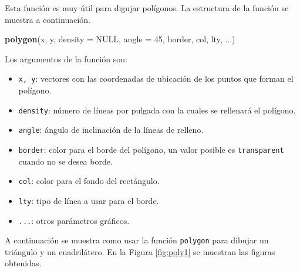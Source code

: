 \documentclass[10pt,]{krantz}
\makeatletter
\newenvironment{Shaded}{\begin{snugshade}}{\end{snugshade}}
\newcommand{\KeywordTok}[1]{\textcolor[rgb]{0.13,0.29,0.53}{\textbf{{#1}}}}
\newcommand{\DataTypeTok}[1]{\textcolor[rgb]{0.13,0.29,0.53}{{#1}}}
\newcommand{\DecValTok}[1]{\textcolor[rgb]{0.00,0.00,0.81}{{#1}}}
\newcommand{\OtherTok}[1]{\textcolor[rgb]{0.56,0.35,0.01}{{#1}}}
\newcommand{\NormalTok}[1]{{#1}}
\providecommand{\tightlist}{%
  \setlength{\itemsep}{0pt}\setlength{\parskip}{0pt}}
\newenvironment{kframe}{%
\medskip{}
\setlength{\fboxsep}{.8em}
 \def\at@end@of@kframe{}%
 \ifinner\ifhmode%
  \def\at@end@of@kframe{\end{minipage}}%
  \begin{minipage}{\columnwidth}%
 \fi\fi%
 \def\FrameCommand##1{\hskip\@totalleftmargin \hskip-\fboxsep
 \colorbox{shadecolor}{##1}\hskip-\fboxsep
     \hskip-\linewidth \hskip-\@totalleftmargin \hskip\columnwidth}%
 \MakeFramed {\advance\hsize-\width
   \@totalleftmargin\z@ \linewidth\hsize
   \@setminipage}}%
 {\par\unskip\endMakeFramed%
 \at@end@of@kframe}
\renewenvironment{Shaded}{\begin{kframe}}{\end{kframe}}
\makeatother
\begin{document}
Esta función es muy útil para digujar polígonos. La estructura de la
función se muestra a continuación.

\begin{Shaded}
\begin{Highlighting}[]
\KeywordTok{polygon}\NormalTok{(x, y, }\DataTypeTok{density =} \OtherTok{NULL}\NormalTok{, }\DataTypeTok{angle =} \DecValTok{45}\NormalTok{,}
        \NormalTok{border, col, lty, ...)}
\end{Highlighting}
\end{Shaded}

Los argumentos de la función son:

\begin{itemize}
\tightlist
\item
  \texttt{x,\ y}: vectores con las coordenadas de ubicación de los
  puntos que forman el polígono.
\item
  \texttt{density}: número de líneas por pulgada con la cuales se
  rellenará el polígono.
\item
  \texttt{angle}: ángulo de inclinación de la líneas de relleno.
\item
  \texttt{border}: color para el borde del polígono, un valor posible es
  \texttt{\textquotesingle{}transparent\textquotesingle{}} cuando no se
  desea borde.
\item
  \texttt{col}: color para el fondo del rectángulo.
\item
  \texttt{lty}: tipo de línea a usar para el borde.
\item
  \texttt{...}: otros parámetros gráficos.
\end{itemize}

A continuación se muestra como usar la función \texttt{polygon} para
dibujar un triángulo y un cuadrilátero. En la Figura \ref{fig:poly1} se
muestran las figuras obtenidas.
\end{document}
